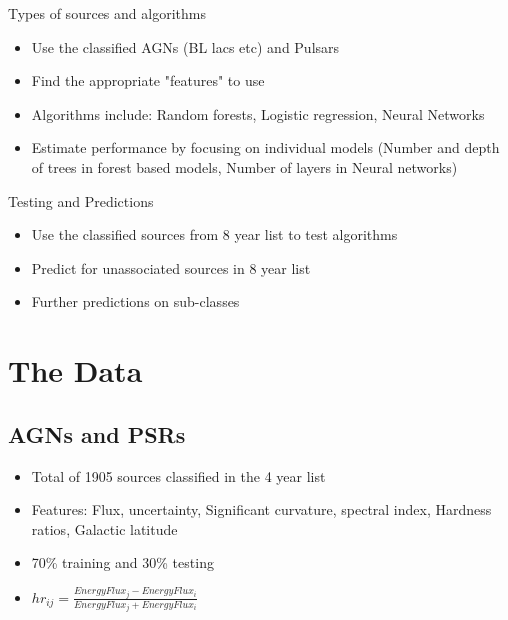 \documentclass{beamer}
\begin{document}
\begin{frame}{Types of sources and algorithms}
 \begin{itemize}
  \item
Use the classified AGNs (BL lacs etc) and Pulsars
  \item
	Find the appropriate "features" to use
  \item
Algorithms include: Random forests, Logistic regression, Neural Networks
  \item
	Estimate performance by focusing on individual models (Number and depth of trees in forest based models, Number of layers in Neural networks)
\end{itemize}
\end{frame}

\begin{frame}{Testing and Predictions}
 \begin{itemize}
  \item
Use the classified sources from 8 year list to test algorithms
  \item
	Predict for unassociated sources in 8 year list
  \item
      Further predictions on sub-classes

\end{itemize}
\end{frame}
\section{The Data}

\subsection{AGNs and PSRs}

\begin{frame}{}
\begin{itemize}
 \item
Total of 1905 sources classified in the 4 year list
 \item
Features: Flux, uncertainty, Significant curvature, spectral index, Hardness ratios,  Galactic latitude
 \item
70\% training and 30\% testing 
 \item
$hr_{ij}=\frac{EnergyFlux_j - EnergyFlux_i}{EnergyFlux_j + EnergyFlux_i}$

\end{itemize} 

\end{frame}
\end{document}
